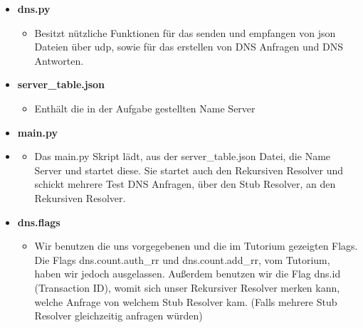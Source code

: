\begin{itemize}
    \item \textbf{dns.py}
        \begin{itemize}
            \item Besitzt nützliche Funktionen für das senden und empfangen von json Dateien über udp, sowie für das erstellen von DNS Anfragen und DNS Antworten.
        \end{itemize} 
    
    \item \textbf{server\_table.json}
        \begin{itemize}
            \item Enthält die in der Aufgabe gestellten Name Server
        \end{itemize}
    
    \item \textbf{main.py}
        \item \begin{itemize}
            \item Das main.py Skript lädt, aus der server\_table.json Datei, die Name Server und startet diese. Sie startet auch den Rekursiven Resolver und schickt mehrere Test DNS Anfragen, über den Stub Resolver, an den Rekursiven Resolver.
        \end{itemize}
    
    \item \textbf{dns.flags}
        \begin{itemize}
            \item Wir benutzen die uns vorgegebenen und die im Tutorium gezeigten Flags. Die Flags dns.count.auth\_rr und dns.count.add\_rr, vom Tutorium, haben wir jedoch ausgelassen. Außerdem benutzen wir die Flag dns.id (Transaction ID), womit sich unser Rekursiver Resolver merken kann, welche Anfrage von welchem Stub Resolver kam. (Falls mehrere Stub Resolver gleichzeitig anfragen würden)
        \end{itemize}
\end{itemize}

\newpage
